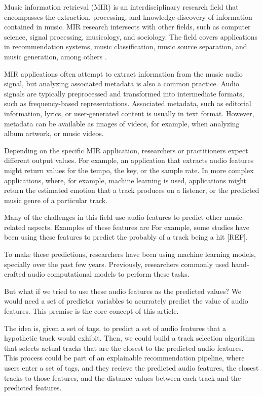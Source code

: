 \documentclass[sn-mathphys]{sn-jnl}%
\theoremstyle{thmstyleone}%
\theoremstyle{thmstyletwo}%
\theoremstyle{thmstylethree}%
\begin{document}
Music information retrieval (MIR) is an interdisciplinary research field that encompasses the extraction,
processing, and knowledge discovery of information contained in music.
MIR research intersects with other fields, such as computer science, signal processing, musicology, and sociology.
The field covers applications in recommendation systems, music classification,
music source separation, and music generation, among others \cite{ramirez2020machine}.

MIR applications often attempt to extract information from the music audio signal,
but analyzing associated metadata is also a common practice.
Audio signals are typically preprocessed and transformed into intermediate formats, such as frequency-based representations.
Associated metadata, such as editorial information, lyrics, or user-generated content is usually in text format.
However, metadata can be available as images of videos, for example, when analyzing album artwork, or music videos.

Depending on the specific MIR application, researchers or practitioners expect different output values.
For example, an application that extracts audio features might return values for the tempo, the key, or the sample rate.
In more complex applications, where, for example, machine learning is used, applications might return the estimated emotion that a track produces on a listener, or the predicted music genre of a particular track.



Many of the challenges in this field use audio features to predict other music-related aspects.
Examples of these features are 
For example, some studies have been using these features to predict the probably of a track being a hit [REF].

To make these predictions, researchers have been using machine learning models, specially over the past few years.
Previously, researchers commonly used hand-crafted audio computational models to perform these tasks.

But what if we tried to use these audio features as the predicted values? We would need a set of predictor variables to
acurrately predict the value of audio features.
This premise is the core concept of this article.

The idea is, given a set of tags, to predict a set of audio features that a hypothetic track would exhibit.
Then, we could build a track selection algorithm that selects actual tracks that are the closest to the predicted audio features.
This process could be part of an explainable recommendation pipeline, where users enter a set of tags, and they recieve the predicted audio features, the closest tracks to those features, and the distance values between each track and the predicted features.
\end{document}
